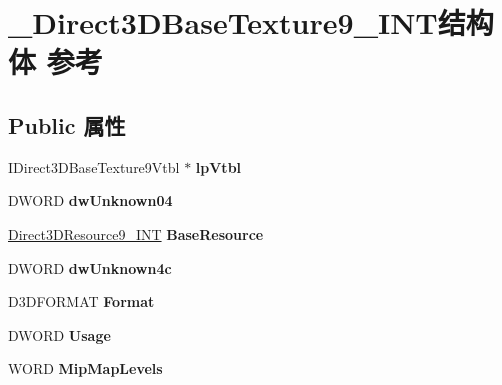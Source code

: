\hypertarget{struct___direct3_d_base_texture9___i_n_t}{}\section{\+\_\+\+Direct3\+D\+Base\+Texture9\+\_\+\+I\+N\+T结构体 参考}
\label{struct___direct3_d_base_texture9___i_n_t}
\subsection*{Public 属性}
\begin{DoxyCompactItemize}
\item 
\mbox{\label{struct___direct3_d_base_texture9___i_n_t_a95d7cab8f7244c5ab89c3b2bb08f4570}} 
I\+Direct3\+D\+Base\+Texture9\+Vtbl $\ast$ {\bfseries lp\+Vtbl}
\item 
\mbox{\label{struct___direct3_d_base_texture9___i_n_t_ad522bf9fc5e41bdc8a3f28381e875800}} 
D\+W\+O\+RD {\bfseries dw\+Unknown04}
\item 
\mbox{\label{struct___direct3_d_base_texture9___i_n_t_a3fa762ef9326acaf0f3cd26f4df9aff8}} 
\hyperlink{struct___direct3_d_resource9___i_n_t}{Direct3\+D\+Resource9\+\_\+\+I\+NT} {\bfseries Base\+Resource}
\item 
\mbox{\label{struct___direct3_d_base_texture9___i_n_t_abda519747f23e0d43aa59dd6d91f4540}} 
D\+W\+O\+RD {\bfseries dw\+Unknown4c}
\item 
\mbox{\label{struct___direct3_d_base_texture9___i_n_t_a9123087b56ba573a2cc81f6e04fe9846}} 
D3\+D\+F\+O\+R\+M\+AT {\bfseries Format}
\item 
\mbox{\label{struct___direct3_d_base_texture9___i_n_t_a4afd6f98e351246bd0650643364237d2}} 
D\+W\+O\+RD {\bfseries Usage}
\item 
\mbox{\label{struct___direct3_d_base_texture9___i_n_t_af96b94e7931e75cbb03066c83189d5c5}} 
W\+O\+RD {\bfseries Mip\+Map\+Levels}

\end{DoxyCompactItemize}
